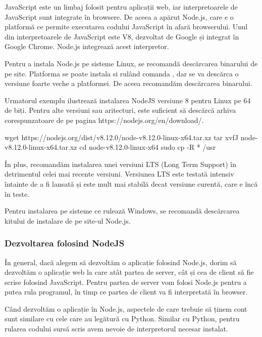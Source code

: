 JavaScript este un limbaj folosit pentru aplicații web, iar interpretoarele de
JavaScript sunt integrate în browsere. De aceea a apărut Node.js, care e o
platformă ce permite executarea codului JavaScript în afară browserului. Unul
din interpretoarele de JavaScript este V8, dezvoltat de Google și integrat în
Google Chrome. Node.js integrează acest interpretor.

Pentru a instala Node.js pe sisteme Linux, se recomandă descărcarea binarului de
pe site. Platforma se poate instala si rulând comanda , dar se va descărca o versiune foarte veche a platformei. De aceea
recomandăm descărcarea binarului.

Urmatorul exemplu ilustrează instalarea NodeJS versiune 8 pentru Linux pe 64 de
biți. Pentru alte versiuni sau aritecturi, este suficient să descărcă arhiva
corespunzatoare de pe pagina https://nodejs.org/en/download/.

\begin{screen}
wget https://nodejs.org/dist/v8.12.0/node-v8.12.0-linux-x64.tar.xz
tar xvfJ node-v8.12.0-linux-x64.tar.xz
cd node-v8.12.0-linux-x64
sudo cp -R * /usr
\end{screen}

În plus, recomandăm instalarea unei versiuni LTS 
(Long Term Support) în detrimentul celei mai recente versiuni. Versiunea LTS
este testată intensiv întainte de a fi lansată și este mult mai stabilă decat
versiune curentă, care e încă în teste.

Pentru instalarea pe sisteme ce rulează Windows, se recomandă descărcarea
kitului de instalare de pe site-ul Node.js.

\subsubsection{Dezvoltarea folosind NodeJS}
\label{sec:appdev-ideinstall-js-dev}

În general, dacă alegem să dezvoltăm o aplicație folosind Node.js, dorim să
dezvoltăm o aplicație web la care atât partea de server, cât și cea de client să
fie scrise folosind JavaScript. Pentru partea de server vom folosi Node.js
pentru a putea rula programul, în timp ce partea de client va fi interpretată în
browser.

Când dezvoltăm o aplicație în Node.js, aspectele de care trebuie să ținem cont
sunt similare cu cele care au legătură cu Python. Similar cu Python, pentru
rularea codului sursă scris avem nevoie de interpretorul necesar instalat.

